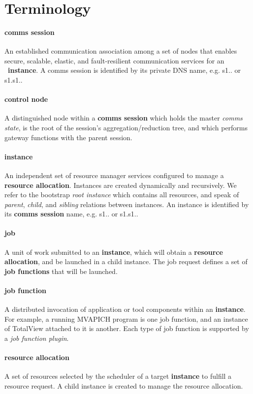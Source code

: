 \section{Terminology}

\paragraph{comms session}
An established communication association among a set of nodes that
enables secure, scalable, elastic, and fault-resilient communication
services for an \ngrm\ {\bf instance}.
A comms session is identified by its private DNS name, e.g. s1.\ngrm.
or s1.s1.\ngrm.

\paragraph{control node}
A distinguished node within a {\bf comms session} which holds the master
{\em comms state}, is the root of the session's aggregation/reduction tree,
and which performs gateway functions with the parent session.

\paragraph{instance}
An independent set of resource manager services configured to manage
a {\bf resource allocation}.
Instances are created dynamically and recursively.
We refer to the bootstrap {\em root instance} which contains all resources,
and speak of {\em parent}, {\em child}, and {\em sibling} relations between
instances.
An instance is identified by its {\bf comms session} name, e.g. s1.\ngrm.
or s1.s1.\ngrm.

\paragraph{job}
A unit of work submitted to an {\bf instance}, which will obtain a
{\bf resource allocation}, and be launched in a child instance.
The job request defines a set of {\bf job functions} that will be launched.

\paragraph{job function}
A distributed invocation of application or tool components within an
{\bf instance}.  For example, a running MVAPICH program is one job
function, and an instance of TotalView\textsuperscript{\textregistered}
attached to it is another.
Each type of job function is supported by a {\em job function plugin}.

\paragraph{resource allocation}
A set of resources selected by the scheduler of a target {\bf instance}
to fulfill a resource request.
A child instance is created to manage the resource allocation.
